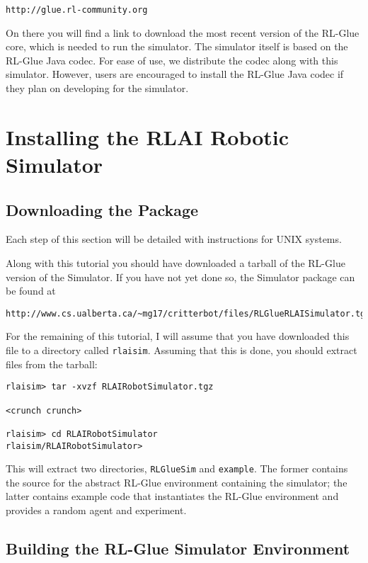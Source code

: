 \documentclass[12pt]{article}
\newcommand{\code}[1]{\texttt{#1}}
\begin{document}
\begin{verbatim}
http://glue.rl-community.org
\end{verbatim}

On there you will find a link to download the most recent version of the RL-Glue
core, which is needed to run the simulator. The simulator itself is based
on the RL-Glue Java codec. For ease of use, we distribute the codec along
with this simulator. However, users are encouraged to install the RL-Glue
Java codec if they plan on developing for the simulator. 

\section{Installing the RLAI Robotic Simulator}\label{sec:installation}

\subsection{Downloading the Package}

Each step of this section will be detailed with instructions for UNIX
systems. 

Along with this tutorial you should have downloaded a tarball of the 
RL-Glue version of the Simulator. If you have not yet done so, the Simulator
package can be found at

\begin{verbatim}
http://www.cs.ualberta.ca/~mg17/critterbot/files/RLGlueRLAISimulator.tgz
\end{verbatim}

For the remaining of this tutorial, I will assume that you have downloaded
this file to a directory called \verb+rlaisim+. Assuming that this 
is done, you should extract files from the tarball:

\begin{verbatim}
rlaisim> tar -xvzf RLAIRobotSimulator.tgz

<crunch crunch>

rlaisim> cd RLAIRobotSimulator
rlaisim/RLAIRobotSimulator>
\end{verbatim}

This will extract two directories, \code{RLGlueSim} and \code{example}.
The former contains the source for the abstract RL-Glue environment containing
the simulator; the latter contains example code that instantiates the
RL-Glue environment and provides a random agent and experiment.

\subsection{Building the RL-Glue Simulator Environment}
\end{document}
